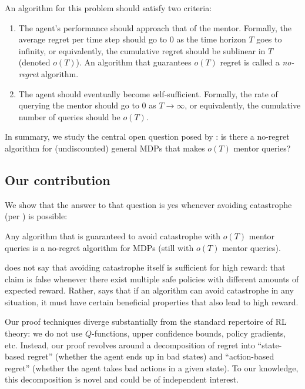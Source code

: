 An algorithm for this problem should satisfy two criteria:
\begin{enumerate}
    \item The agent's performance should approach that of the mentor. Formally, the average regret per time step should go to 0 as the time horizon $T$ goes to infinity, or equivalently, the cumulative regret should be sublinear in $T$ (denoted $o(T)$). An algorithm that guarantees $o(T)$ regret is called a \emph{no-regret} algorithm.  %
    \item The agent should eventually become self-sufficient. Formally, the rate of querying the mentor should go to 0 as $T \to \infty$, or equivalently, the cumulative number of queries should be $o(T)$.
\end{enumerate}
In summary, we study the central open question posed by \citet{plaut_avoiding_2024}: is there a no-regret algorithm for (undiscounted) general MDPs that makes $o(T)$ mentor queries?

\subsection{Our contribution}\label{sec:contribution}
We show that the answer to that question is yes whenever avoiding catastrophe (per ) is possible:

\begin{theoremNumbered} 
Any algorithm that is guaranteed to avoid catastrophe with $o(T)$ mentor queries is a no-regret algorithm for MDPs (still with $o(T)$ mentor queries).
\end{theoremNumbered}

 does not say that avoiding catastrophe itself is sufficient for high reward: that claim is false whenever there exist multiple safe policies with different amounts of expected reward. Rather,  says that if an algorithm can avoid catastrophe in any situation, it must have certain beneficial properties that also lead to high reward. 


Our proof techniques diverge substantially from the standard repertoire of RL theory: we do not use $Q$-functions, upper confidence bounds, policy gradients, etc. Instead, our proof revolves around a decomposition of regret into ``state-based regret'' (whether the agent ends up in bad states) and ``action-based regret'' (whether the agent takes bad actions in a given state). To our knowledge, this decomposition is novel and could be of independent interest.

